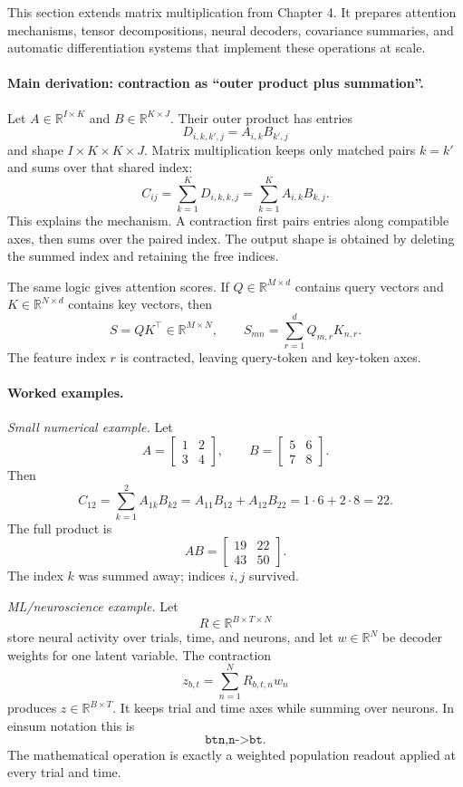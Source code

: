 This section extends matrix multiplication from Chapter 4. It prepares attention mechanisms, tensor decompositions, neural decoders, covariance summaries, and automatic differentiation systems that implement these operations at scale.

\paragraph{Main derivation: contraction as ``outer product plus summation''.}
Let \(A\in\mathbb{R}^{I\times K}\) and \(B\in\mathbb{R}^{K\times J}\). Their outer product has entries
\[
D_{i,k,k',j}=A_{i,k}B_{k',j}
\]
and shape \(I\times K\times K\times J\). Matrix multiplication keeps only matched pairs \(k=k'\) and sums over that shared index:
\[
C_{ij}
=\sum_{k=1}^K D_{i,k,k,j}
=\sum_{k=1}^K A_{i,k}B_{k,j}.
\]
This explains the mechanism. A contraction first pairs entries along compatible axes, then sums over the paired index. The output shape is obtained by deleting the summed index and retaining the free indices.

The same logic gives attention scores. If \(Q\in\mathbb{R}^{M\times d}\) contains query vectors and \(K\in\mathbb{R}^{N\times d}\) contains key vectors, then
\[
S=QK^\top\in\mathbb{R}^{M\times N},
\qquad
S_{mn}=\sum_{r=1}^d Q_{m,r}K_{n,r}.
\]
The feature index \(r\) is contracted, leaving query-token and key-token axes.

\paragraph{Worked examples.}
\emph{Small numerical example.} Let
\[
A=
\begin{bmatrix}
1&2\\
3&4
\end{bmatrix},
\qquad
B=
\begin{bmatrix}
5&6\\
7&8
\end{bmatrix}.
\]
Then
\[
C_{12}
=\sum_{k=1}^2 A_{1k}B_{k2}
=A_{11}B_{12}+A_{12}B_{22}
=1\cdot 6+2\cdot 8=22.
\]
The full product is
\[
AB=
\begin{bmatrix}
19&22\\
43&50
\end{bmatrix}.
\]
The index \(k\) was summed away; indices \(i,j\) survived.

\emph{ML/neuroscience example.} Let
\[
R\in\mathbb{R}^{B\times T\times N}
\]
store neural activity over trials, time, and neurons, and let \(w\in\mathbb{R}^N\) be decoder weights for one latent variable. The contraction
\[
z_{b,t}=\sum_{n=1}^N R_{b,t,n}w_n
\]
produces \(z\in\mathbb{R}^{B\times T}\). It keeps trial and time axes while summing over neurons. In einsum notation this is
\[
\texttt{btn,n->bt}.
\]
The mathematical operation is exactly a weighted population readout applied at every trial and time.

